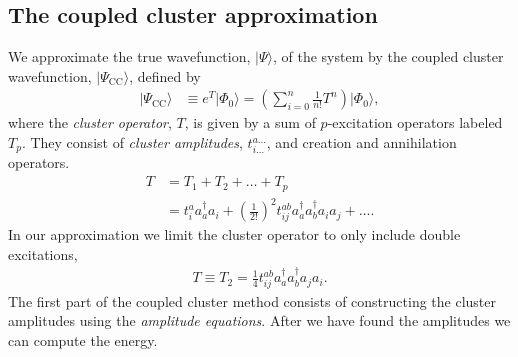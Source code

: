 \documentclass[
    a4paper, aps, twocolumn, floatfix, superscriptaddress,
    nofootinbib]{revtex4-1}
\newcommand{\1}{\mathds{1}}
\newcommand{\para}[1]{\left(#1\right)}
\newcommand{\ket}[1]{\rvert #1\rangle}
\newcommand{\acr}[1]{a_{#1}^{\dagger}}
\newcommand{\ade}[1]{a_{#1}}
\begin{document}
    \subsection{The coupled cluster approximation}
        We approximate the true wavefunction, $\ket{\Psi}$, of the system by the
        coupled cluster wavefunction, $\ket{\Psi_{\text{CC}}}$, defined by
        \begin{align}
            \ket{\Psi_{\text{CC}}}
            &\equiv e^{T}\ket{\Phi_0}
            = \para{
                \sum_{i = 0}^n
                \frac{1}{n!}T^n
            }\ket{\Phi_0},
        \end{align}
        where the \emph{cluster operator}, $T$, is given by a sum of
        $p$-excitation operators labeled $T_p$. They consist of \emph{cluster
        amplitudes}, $t_{i\dots}^{a\dots}$, and creation and annihilation
        operators.
        \begin{align}
            T &= T_1 + T_2 + \dots + T_p \\
            &=
            t_i^a\acr{a}\ade{i}
            + \para{\frac{1}{2!}}^2
            t_{ij}^{ab}\acr{a}\acr{b}\ade{i}\ade{j}
            + \dots.
        \end{align}
        In our approximation we limit the cluster operator to only include
        double excitations,
        \begin{align}
            T \equiv T_2
            = \frac{1}{4}t_{ij}^{ab}\acr{a}\acr{b}\ade{j}\ade{i}.
            \label{eq:T_2}
        \end{align}
        The first part of the coupled cluster method consists of constructing
        the cluster amplitudes using the \emph{amplitude equations}. After we
        have found the amplitudes we can compute the energy.
\end{document}
